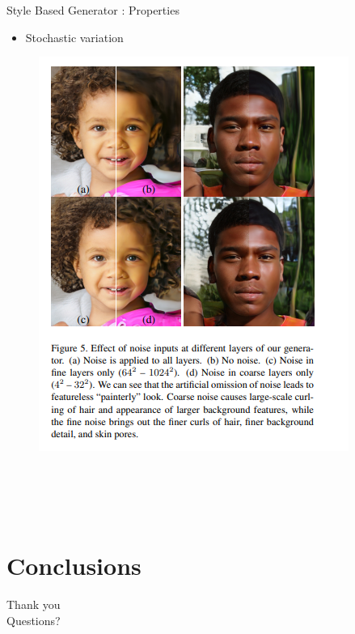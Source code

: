 \documentclass[10pt]{beamer}
\begin{document}
\begin{frame}[fragile]{Style Based Generator : Properties }
        \begin{itemize}
        \item Stochastic variation
    \end{itemize}
    \begin{figure}[ht]
         \hspace*{-1cm}\includegraphics[width=0.7\linewidth]{stochasticvariation.png} \\ \\ \\ \\ \\
    \end{figure}

\end{frame}

\section{Conclusions}



\begin{frame}[standout]
  Thank you \\ Questions?
\end{frame}
\end{document}

